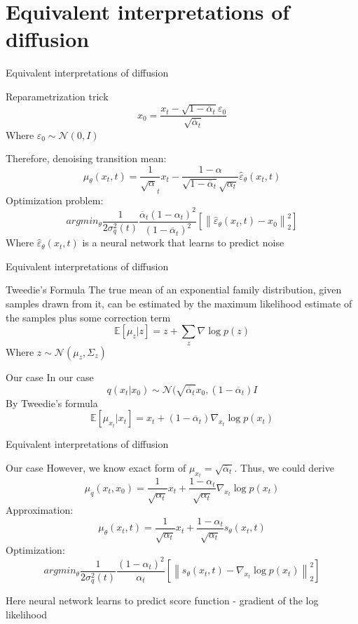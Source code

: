 \documentclass{beamer}
\newcommand\norm[1]{\left\lVert#1\right\rVert}
\begin{document}
\section{Equivalent interpretations of diffusion}
\begin{frame}{Equivalent interpretations of diffusion}
    \begin{block}{Reparametrization trick}
    \[x_0 = \frac{x_t - \sqrt{1 - \overline{\alpha}_t}\varepsilon_0}{\sqrt{\overline{\alpha}_t}}\]
    Where $\varepsilon_0 \sim \mathcal{N}(0, I)$ 
    
    Therefore, denoising transition mean:
    \[\mu_{\theta}(x_t, t) = \dfrac{1}{\sqrt{\alpha}_t}x_t - \dfrac{1 - \alpha}{\sqrt{1 - \overline{\alpha}_t}\sqrt{\alpha_t}}\widehat{\varepsilon}_{\theta}(x_t, t)\]
    Optimization problem:
    \[argmin_{\theta} \dfrac{1}{2\sigma^2_q(t)} \dfrac{\overline{\alpha}_t (1 - \alpha_t)^2}{(1 - \overline{\alpha}_t)^2}{}\left[\norm{\widehat{\varepsilon}_\theta(x_t, t)-x_0}_2^2\right]\]
    Where $\widehat{\varepsilon}_\theta(x_t, t)$ is a neural network that learns to predict noise
    \end{block}
\end{frame}

\begin{frame}{Equivalent interpretations of diffusion}
    \begin{block}{Tweedie's Formula}
    The true mean of an exponential family distribution, given samples drawn from it, can be estimated by the maximum likelihood estimate of the samples plus some correction term
    \[\mathbb{E}[\mu_z|z] = z + \sum_z \nabla{\log p(z)}\]
    Where $z \sim \mathcal{N}(\mu_z, \Sigma_z)$
    \end{block}
    \begin{block}{Our case}
    In our case
    \[q(x_t|x_0) \sim \mathcal{N}(\sqrt{\overline{\alpha}_t} x_0, (1 - \overline{\alpha}_t)I\]
    By Tweedie's formula
    \[\mathbb{E}[\mu_{x_t}|x_t] = x_t + (1 - \overline{\alpha}_t) \nabla_{x_t}{\log p(x_t)}\]
    \end{block}
\end{frame}

\begin{frame}{Equivalent interpretations of diffusion}
    \begin{block}{Our case}
    However, we know exact form of $\mu_{x_t} = \sqrt{\overline{\alpha}_t}$.
    Thus, we could derive
    \[\mu_q(x_t, x_0) = \dfrac{1}{\sqrt{\alpha_t}} x_t + \dfrac{1 - \alpha_t}{\sqrt{\alpha_t}}\nabla_{x_t}{\log p(x_t)}\]
    Approximation:
    \[\mu_{\theta}(x_t, t) = \dfrac{1}{\sqrt{\alpha_t}} x_t + \dfrac{1 - \alpha_t}{\sqrt{\alpha_t}}s_{\theta}(x_t, t)\]
    Optimization:
     \[argmin_{\theta} \dfrac{1}{2\sigma^2_q(t)} \dfrac{(1 - \alpha_t)^2}{\alpha_t}\left[\norm{s_{\theta}(x_t, t)-\nabla_{x_t}{\log p(x_t)}}_2^2\right]\]
    \end{block}
    Here neural network learns to predict score function - gradient of the log likelihood 
\end{frame}
\end{document}
